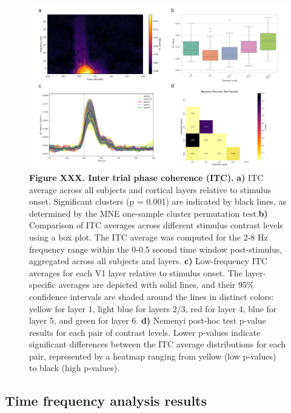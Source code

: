 \documentclass[
  letterpaper,
  DIV=11,
  numbers=noendperiod]{scrartcl}
\begin{document}
\begin{figure}[H]

{\centering \includegraphics{images/ITC.png}

}

\caption{\textbf{Figure XXX. Inter trial phase coherence (ITC).}
\textbf{a)} ITC average across all subjects and cortical layers relative
to stimulus onset. Significant clusters (p = 0.001) are indicated by
black lines, as determined by the MNE one-sample cluster permutation
test.\textbf{b)} Comparison of ITC averages across different stimulus
contrast levels using a box plot. The ITC average was computed for the
2-8 Hz frequency range within the 0-0.5 second time window
post-stimulus, aggregated across all subjects and layers. \textbf{c)}
Low-frequency ITC averages for each V1 layer relative to stimulus onset.
The layer-specific averages are depicted with solid lines, and their
95\% confidence intervals are shaded around the lines in distinct
colors: yellow for layer 1, light blue for layers 2/3, red for layer 4,
blue for layer 5, and green for layer 6. \textbf{d)} Nemenyi post-hoc
test p-value results for each pair of contrast levels. Lower p-values
indicate significant differences between the ITC average distributions
for each pair, represented by a heatmap ranging from yellow (low
p-values) to black (high p-values). }

\end{figure}%

\subsection{Time frequency analysis
results}\label{time-frequency-analysis-results}
\end{document}
